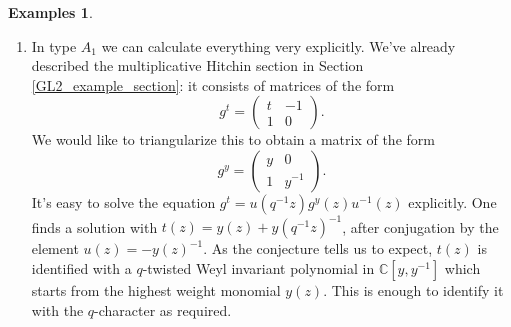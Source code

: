\documentclass[11pt, oneside, reqno]{amsart}
\theoremstyle{definition} \newtheorem{definition}{Definition}[section]
\theoremstyle{definition} \newtheorem{remark}[definition]{Remark}
\theoremstyle{definition} \newtheorem{remarks}[definition]{Remarks}
\theoremstyle{definition} \newtheorem{question}[definition]{Question}
\theoremstyle{definition} \newtheorem*{note}{Note}
\theoremstyle{definition} \newtheorem{example}[definition]{Example}
\theoremstyle{definition} \newtheorem{examples}[definition]{Examples}
\begin{document}
\begin{examples}
\begin{enumerate}
 \item In type $A_1$ we can calculate everything very explicitly.  We've already described the multiplicative Hitchin section in Section \ref{GL2_example_section}: it consists of matrices of the form
\begin{equation*}
  g^{t} =
  \begin{pmatrix}
    t   & - 1 \\
    1 & 0
  \end{pmatrix}.
\end{equation*}
We would like to triangularize this to obtain a matrix of the form
\begin{equation*}
  g^{y} =
  \begin{pmatrix}
    y  & 0 \\
    1 & y^{-1} 
  \end{pmatrix}.
\end{equation*}
It's easy to solve the equation $g^t = u(q^{-1}z)g^y(z) u^{-1}(z)$ explicitly.  One finds a solution with $t(z) = y(z) + y(q^{-1}z)^{-1}$, after conjugation by the element $u(z) = - y(z)^{-1}$.  As the conjecture tells us to expect, $t(z)$ is identified with a $q$-twisted Weyl invariant polynomial in $\mathbb{C}[y, y^{-1}]$ which starts from the highest weight monomial $y(z)$.   This is enough to identify it with the $q$-character as required.


\end{enumerate}
\end{examples}
\end{document}
